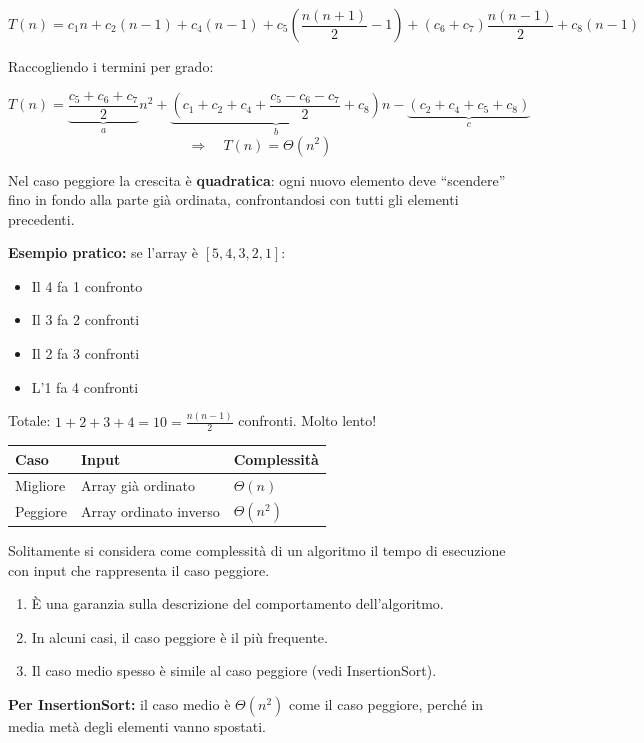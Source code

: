 \[
T(n) = c_1 n + c_2(n-1) + c_4(n-1)
+ c_5\!\left(\frac{n(n+1)}{2} - 1\right)
+ (c_6 + c_7)\frac{n(n-1)}{2}
+ c_8(n-1)
\]

Raccogliendo i termini per grado:

\[
T(n) = \underbrace{\frac{c_5 + c_6 + c_7}{2}}_{a} n^2
+ \underbrace{\left(c_1 + c_2 + c_4 + \frac{c_5 - c_6 - c_7}{2} + c_8\right)}_{b} n
- \underbrace{(c_2 + c_4 + c_5 + c_8)}_{c}
\]
\[
\Rightarrow \quad \boxed{T(n) = \Theta(n^2)}
\]

\begin{nota}
	Nel caso peggiore la crescita è \textbf{quadratica}: ogni nuovo
	elemento deve ``scendere'' fino in fondo alla parte già ordinata,
	confrontandosi con tutti gli elementi precedenti.
	
	\textbf{Esempio pratico:} se l'array è $[5, 4, 3, 2, 1]$:
	\begin{itemize}
		\item Il 4 fa 1 confronto
		\item Il 3 fa 2 confronti
		\item Il 2 fa 3 confronti
		\item L'1 fa 4 confronti
	\end{itemize}
	Totale: $1 + 2 + 3 + 4 = 10 = \frac{n(n-1)}{2}$ confronti. Molto lento!
\end{nota}

\begin{center}
	\begin{tabular}{lll}
		\toprule
		Caso & Input & Complessità \\
		\midrule
		Migliore & Array già ordinato      & $\Theta(n)$   \\
		Peggiore & Array ordinato inverso  & $\Theta(n^2)$ \\
		\bottomrule
	\end{tabular}
\end{center}

\begin{hardnote}
	Solitamente si considera come complessità di un algoritmo il
	tempo di esecuzione con input che rappresenta il caso peggiore.
	
	\begin{enumerate}[label=\arabic*.]
		\item È una garanzia sulla descrizione del comportamento dell'algoritmo.
		\item In alcuni casi, il caso peggiore è il più frequente.
		\item Il caso medio spesso è simile al caso peggiore (vedi InsertionSort).
	\end{enumerate}
	
	\textbf{Per InsertionSort:} il caso medio è $\Theta(n^2)$ come il caso peggiore, perché in media metà degli elementi vanno spostati.
\end{hardnote}

